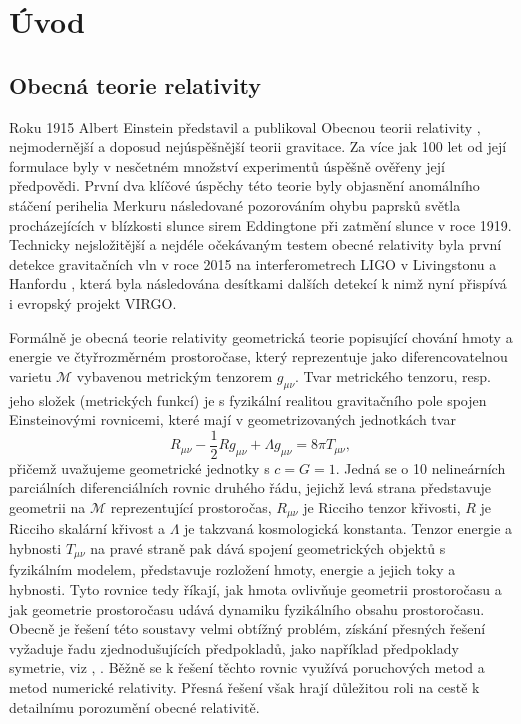 \chapter*{Úvod}

\section*{Obecná teorie relativity}

Roku 1915 Albert Einstein představil a publikoval Obecnou teorii relativity \cite{Einstein1915}, nejmodernější a doposud nejúspěšnější teorii gravitace. Za více jak 100 let od její formulace byly v nesčetném množství
experimentů úspěšně ověřeny její předpovědi. První dva klíčové úspěchy této teorie byly objasnění anomálního stáčení perihelia Merkuru následované pozorováním ohybu paprsků světla procházejících v blízkosti slunce
sirem Eddingtone při zatmění slunce v roce 1919.
Technicky nejsložitější a nejdéle očekávaným testem obecné relativity byla první detekce gravitačních vln v roce 2015 na interferometrech LIGO v Livingstonu a Hanfordu \cite{PhysRevLett.116.061102}, která byla následována
desítkami dalších detekcí k nimž nyní přispívá i evropský projekt VIRGO.


Formálně je obecná teorie relativity geometrická teorie popisující chování hmoty a energie ve čtyřrozměrném prostoročase, který reprezentuje jako diferencovatelnou varietu $\mathcal{M}$ vybavenou metrickým tenzorem $g_{\mu \nu}$.
Tvar metrického tenzoru, resp. jeho složek (metrických funkcí) je s fyzikální realitou gravitačního pole spojen Einsteinovými rovnicemi, které mají v geometrizovaných jednotkách
tvar
\begin{equation}
    \label{eq:einsten_field_equations}
    R_{\mu \nu} - \frac{1}{2} R g_{\mu \nu} + \Lambda g_{\mu \nu} = 8 \pi T_{\mu \nu},
\end{equation}
přičemž uvažujeme geometrické jednotky s $c = G = 1$.
Jedná se o 10 nelineárních parciálních diferenciálních rovnic druhého řádu, jejichž levá strana představuje geometrii na $\mathcal{M}$ reprezentující prostoročas, $R_{\mu \nu}$ je Ricciho tenzor křivosti, $R$ je Ricciho skalární křivost a $\Lambda$
je takzvaná kosmologická konstanta. Tenzor energie a hybnosti $T_{\mu \nu}$ na pravé straně pak dává spojení geometrických objektů s fyzikálním modelem, představuje rozložení hmoty,
energie a jejich toky a hybnosti. Tyto rovnice tedy říkají, jak hmota ovlivňuje geometrii prostoročasu a jak geometrie prostoročasu udává dynamiku fyzikálního obsahu prostoročasu.
Obecně je řešení této soustavy velmi obtížný problém, získání přesných řešení vyžaduje řadu zjednodušujících předpokladů, jako například
předpoklady symetrie, viz \cite{griffiths_podolsky_2009}, \cite{stephani2003}. Běžně se k řešení těchto rovnic využívá poruchových metod a metod
numerické relativity. Přesná řešení však hrají důležitou roli na cestě k detailnímu porozumění obecné relativitě.


